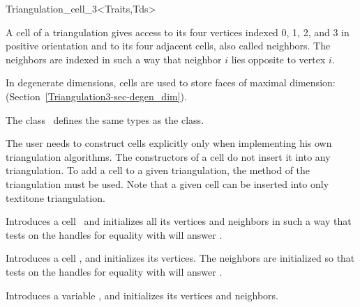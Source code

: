 \begin{ccClassTemplate}{Triangulation_cell_3<Traits,Tds>}

\ccDefinition

A cell of a triangulation gives access to its four vertices indexed 0,
1, 2, and 3 in positive orientation and to its four adjacent cells, also
called neighbors. The neighbors are indexed in such a way that neighbor
$i$ lies opposite to vertex $i$.

In degenerate dimensions, cells are used to store faces of maximal
dimension: (Section~\ref{Triangulation3-sec-degen_dim}).



\ccTypes
The class \ccClassTemplateName\ defines the same types as the
 class.

\begin{ccAdvanced}
\ccCreation
The user needs to construct cells explicitly only when implementing his
own triangulation algorithms. The constructors of a cell do not insert
it into any triangulation. To add a cell to a given triangulation,
the  method of the triangulation must be used. Note
that a given cell can be inserted into only textit{one} triangulation.

{Introduces a cell \ccVar\ and initializes all its vertices and
neighbors in such a way that tests on the handles for equality with
 will answer .} 


{Introduces a cell \ccVar, and initializes its vertices. The 
neighbors are initialized so that tests on the handles for equality with
 will answer .} 

{Introduces a variable \ccVar, and initializes its vertices and neighbors.}


\end{ccAdvanced}
\end{ccClassTemplate}
